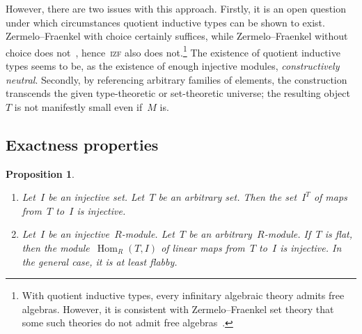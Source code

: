 \documentclass[oneside]{amsart}
\theoremstyle{definition}
\theoremstyle{plain}
\newtheorem{prop}[defn]{Proposition}
\theoremstyle{remark}
\DeclareMathOperator{\Hom}{Hom}
\renewcommand{\_}{\mathpunct{.}\,}
\begin{document}
However, there are two issues with this approach.
Firstly, it is an open question under which circumstances quotient inductive
types can be shown to exist. Zermelo--Fraenkel with choice certainly suffices,
while Zermelo--Fraenkel without choice does not~\cite[Section~9]{shulman-lumsdaine:hits},
hence~\textsc{izf} also does not.\footnote{With quotient inductive types, every infinitary
algebraic theory admits free algebras. However, it is consistent with
Zermelo--Fraenkel set theory that some such theories do not admit free
algebras~\cite{blass:free-algebras}.} The existence of quotient inductive types
seems to be, as the existence of enough injective modules, \emph{constructively
neutral}.
Secondly, by referencing arbitrary families of elements, the construction
transcends the given type-theoretic or set-theoretic universe; the resulting
object~$T$ is not manifestly small even if~$M$ is.


\subsection{Exactness properties}

\begin{prop}\label{prop:hom-flabby}
\begin{enumerate}
\item Let~$I$ be an injective set. Let~$T$ be an arbitrary set. Then the
set~$I^T$ of maps from~$T$ to~$I$ is injective.
\item Let~$I$ be an injective~$R$-module. Let~$T$ be an arbitrary~$R$-module.
If~$T$ is flat, then the module~$\Hom_R(T,I)$ of linear maps from~$T$ to~$I$ is
injective. In the general case, it is at least flabby.
\end{enumerate}\end{prop}
\end{document}
